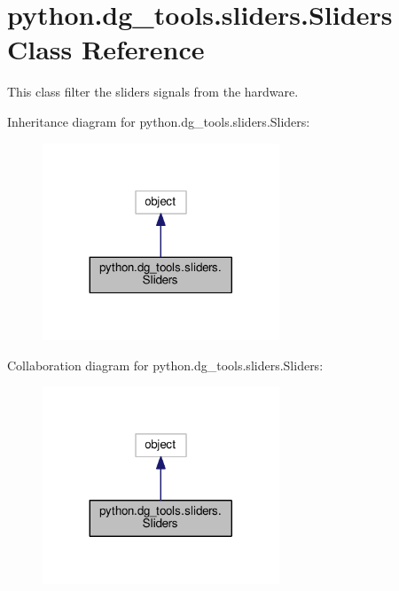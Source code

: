 \hypertarget{classpython_1_1dg__tools_1_1sliders_1_1Sliders}{}\section{python.\+dg\+\_\+tools.\+sliders.\+Sliders Class Reference}
\label{classpython_1_1dg__tools_1_1sliders_1_1Sliders}


This class filter the sliders signals from the hardware.  




Inheritance diagram for python.\+dg\+\_\+tools.\+sliders.\+Sliders\+:
\nopagebreak
\begin{figure}[H]
\begin{center}
\leavevmode
\includegraphics[width=200pt]{classpython_1_1dg__tools_1_1sliders_1_1Sliders__inherit__graph}
\end{center}
\end{figure}


Collaboration diagram for python.\+dg\+\_\+tools.\+sliders.\+Sliders\+:
\nopagebreak
\begin{figure}[H]
\begin{center}
\leavevmode
\includegraphics[width=200pt]{classpython_1_1dg__tools_1_1sliders_1_1Sliders__coll__graph}
\end{center}
\end{figure}
